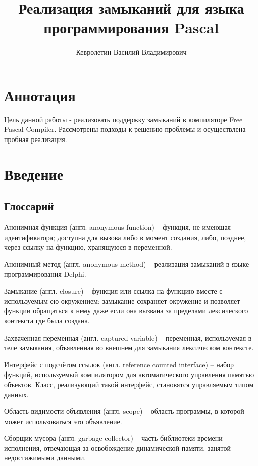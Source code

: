 \documentclass{imcs}
\title{Реализация замыканий для языка программирования Pascal}
\author{Кевролетин Василий Владимирович}
\begin{document}
\maketitle

\tableofcontents
\pagebreak

\section*{Аннотация}
Цель данной работы - реализовать поддержку замыканий в компиляторе Free Pascal Compiler.
Рассмотрены подходы к решению проблемы и осуществлена пробная реализация.

\pagebreak

\section{Введение}
\subsection{Глоссарий}

Анонимная функция (англ. anonymous function) -- функция, не имеющая идентификатора; доступна для
вызова либо в момент создания, либо, позднее, через ссылку на функцию,
хранящуюся в переменной.

Анонимный метод (англ. anonymous method) -- реализация замыканий в языке программирования Delphi\cite{anonymmethods}. 

Замыкание (англ. closure) -- функция или ссылка на функцию вместе с используемым ею
окружением; замыкание сохраняет окружение и позволяет функции
обращаться к нему даже если она вызвана за пределами лексического
контекста где была создана.

Захваченная переменная (англ. captured variable) -- переменная, используемая в теле замыкания,
объявленная во внешнем для замыкания лексическом контексте.

Интерфейс с подсчётом ссылок (англ. reference counted interface) -- набор функций, используемый компилятором для
автоматического управления памятью объектов. Класс, реализующий такой интерфейс,
становятся управляемым типом данных.

Область видимости объявления (англ. scope) -- область программы, в которой может 
использоваться это объявление.

Сборщик мусора (англ. garbage collector) -- часть библиотеки времени исполнения, отвечающая за освобождение
динамической памяти, занятой недостижимыми данными.
\end{document}
